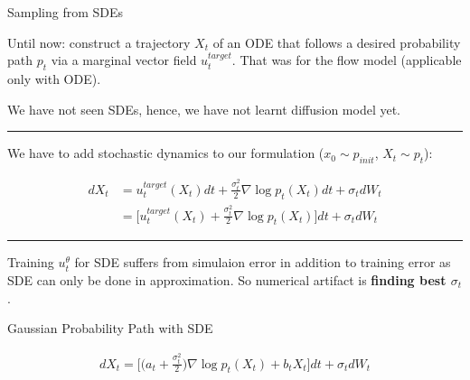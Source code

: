 \documentclass[aspectratio=169,xcolor=dvipsnames,svgnames,x11names,fleqn]{beamer}
\begin{document}
\begin{frame}{Sampling from SDEs}

    \footnotesize 

    Until now: construct a trajectory $X_t$ of an ODE that follows a desired probability path $p_t$ via a marginal vector field $u_t^{target}$. That was for the flow model (applicable only with ODE).

    \vspace{5pt}

    We have not seen SDEs, hence, we have not learnt diffusion model yet.

    \vspace{10pt}

    {\color{androidOrange}\hrule}

    \vspace{10pt}

    We have to add stochastic dynamics to our formulation ($x_0 \sim p_{init}$, $X_t \sim p_t$): 

    \begin{align*}
        dX_t & = u_t^{target}(X_t)dt + \frac{\sigma_t^2}{2}\nabla \log p_t (X_t)dt + \sigma_t dW_t\\
        & = \bigg[  u_t^{target}(X_t) + \frac{\sigma_t^2}{2}\nabla \log p_t (X_t)\bigg]dt + \sigma_t dW_t
    \end{align*}

    \vspace{10pt}

    {\color{androidOrange}\hrule}

    \vspace{10pt}

    Training $u_t^\theta$ for SDE suffers from simulaion error in addition to training error as SDE can only be done in approximation. So numerical artifact is \textbf{finding best $\sigma_t$}.
    
\end{frame}


\begin{frame}{Gaussian Probability Path with SDE}

    \begin{align*}
        dX_t = \bigg[ \bigg( a_t + \frac{\sigma_t^2}{2}  \bigg) \nabla \log p_t(X_t) + b_t X_t \bigg]dt + \sigma_t dW_t
    \end{align*}
    
\end{frame}
\end{document}
